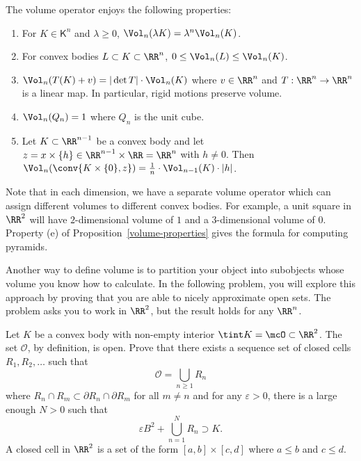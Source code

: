 \documentclass[11pt]{article}
\begin{document}
\begin{prop} \label{volume-properties}
    The volume operator enjoys the following properties:
    \begin{enumerate}[label = (\alph*)]
        \item For $K \in \mathsf{K}^n$ and $\lambda \geq 0$, $\Vol_n(\lambda K) = \lambda^n \Vol_n (K)$. 

        \item For convex bodies $L \subset K \subset \RR^n$, $0 \leq \Vol_n(L) \leq \Vol_n(K)$.

        \item $\Vol_n(T(K) + v) = |\det T| \cdot \Vol_n(K)$ where $v \in \RR^n$ and $T : \RR^n \to \RR^n$ is a linear map. In particular, rigid motions preserve volume. 

        \item $\Vol_n(Q_n) = 1$ where $Q_n$ is the unit cube. 

        \item Let $K \subset \RR^{n-1}$ be a convex body and let $z = x \times \{h\} \in \RR^{n-1} \times \RR = \RR^n$ with $h \neq 0$. Then $\Vol_n(\conv \{K \times \{0\}, z\}) = \frac{1}{n} \cdot \Vol_{n-1}(K) \cdot |h|$. 
    \end{enumerate}
\end{prop}

\begin{remark}
    Note that in each dimension, we have a separate volume operator which can assign different volumes to different convex bodies. For example, a unit square in $\RR^2$ will have $2$-dimensional volume of $1$ and a $3$-dimensional volume of $0$. Property (e) of Proposition~\ref{volume-properties} gives the formula for computing pyramids. 
\end{remark}

Another way to define volume is to partition your object into subobjects whose volume you know how to calculate. In the following problem, you will explore this approach by proving that you are able to nicely approximate open sets. The problem asks you to work in $\RR^2$, but the result holds for any $\RR^n$. 

\begin{prob}[20 points]
    Let $K$ be a convex body with non-empty interior $\tint K = \mcO \subset \RR^2$. The set $\mathcal{O}$, by definition, is open. Prove that there exists a sequence set of closed cells $R_1, R_2, \ldots$ such that 
    \[
        \mathcal{O} = \bigcup_{n \geq 1} R_n
    \]
    where $R_n \cap R_m \subset \partial R_n \cap \partial R_m$ for all $m \neq n$ and for any $\varepsilon > 0$, there is a large enough $N > 0$ such that 
    \[
        \varepsilon B^2 + \bigcup_{n = 1}^N R_n \supset K.
    \]
    A closed cell in $\RR^2$ is a set of the form $[a, b] \times [c, d]$ where $a \leq b$ and $c \leq d$.

\end{prob}
\end{document}

